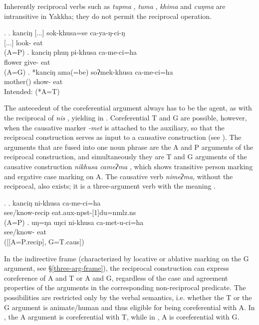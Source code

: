 Inherently reciprocal verbs such as \emph{tupma} , \emph{tuma} , \emph{khima}  and \emph{cuŋma}  are intransitive in Yakkha; they do not permit the reciprocal operation. 

\ex. \ag. kanciŋ [...] sok-khusa=se ca-ya-ŋ-ci-ŋ\\
  [...] look- eat\\
 (A=P) 
\bg. kanciŋ phuŋ pi-khusa ca-me-ci=ha\\
 flower give- eat\\
 (A=G)
\bg. *kanciŋ ama(=be) soʔmek-khusa ca-me-ci=ha\\
 mother() show- eat\\
Intended:  (*A=T)


The antecedent of the coreferential argument always has to be the agent, as with the reciprocal of \emph{nis} , yielding  in \Next[a]. Coreferential T and G are possible, however, when the causative marker \emph{-met} is attached to the auxiliary, so that the reciprocal construction serves as input to a causative construction (see \Next[b]). The arguments that are fused into one noun phrase are the A and P arguments of the reciprocal construction, and simultaneously they are T and G arguments of the causative construction \emph{nikhusa cameʔma} , which shows transitive person marking and ergative case marking on A. The causative verb \emph{nimeʔma}, without the reciprocal, also exists; it is a three-argument verb with the meaning  .

\ex. \ag. kanciŋ ni-khusa  ca-me-ci=ha\\
			   see/know-{\sc recip}  eat{\sc .aux-npst-[1]du=nmlz.ns}\\
			 (A=P)
	\bg. uŋ=ŋa uŋci ni-khusa ca-met-u-ci=ha\\
	  see/know- eat\\
	 ([[A=P.{\sc recip}], G=T.{\sc caus}])	
	

In the indirective frame (characterized by locative or ablative marking on the G argument, see §\ref{three-arg-frame}), the reciprocal construction can express coreference of A and T or A and G, regardless of the case and agreement properties of the arguments in the corresponding  non-reciprocal predicate. The possibilities are restricted only by the verbal semantics, i.e. whether the T or the G argument is animate/human and thus eligible for being coreferential with A.  In \Next[a], the A argument  is coreferential with T, while in \Next[b], A is coreferential with G.

